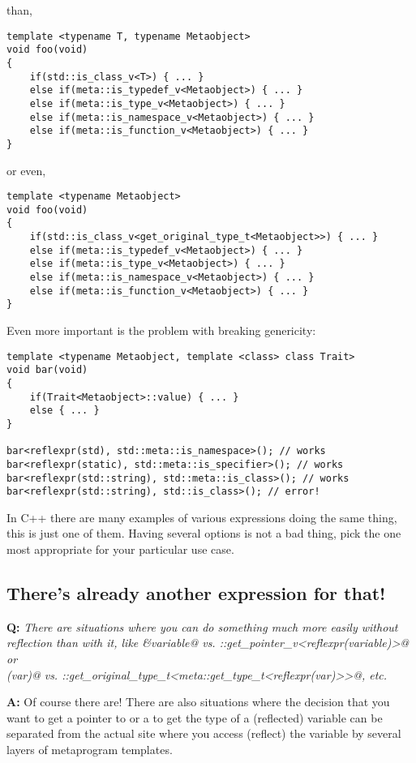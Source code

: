 than,

\begin{verbatim}
template <typename T, typename Metaobject>
void foo(void)
{
	if(std::is_class_v<T>) { ... }
	else if(meta::is_typedef_v<Metaobject>) { ... }
	else if(meta::is_type_v<Metaobject>) { ... }
	else if(meta::is_namespace_v<Metaobject>) { ... }
	else if(meta::is_function_v<Metaobject>) { ... }
}
\end{verbatim}

or even,

\begin{verbatim}
template <typename Metaobject>
void foo(void)
{
	if(std::is_class_v<get_original_type_t<Metaobject>>) { ... }
	else if(meta::is_typedef_v<Metaobject>) { ... }
	else if(meta::is_type_v<Metaobject>) { ... }
	else if(meta::is_namespace_v<Metaobject>) { ... }
	else if(meta::is_function_v<Metaobject>) { ... }
}
\end{verbatim}

Even more important is the problem with breaking genericity:

\begin{verbatim}
template <typename Metaobject, template <class> class Trait>
void bar(void)
{
	if(Trait<Metaobject>::value) { ... }
	else { ... }
}

bar<reflexpr(std), std::meta::is_namespace>(); // works
bar<reflexpr(static), std::meta::is_specifier>(); // works
bar<reflexpr(std::string), std::meta::is_class>(); // works
bar<reflexpr(std::string), std::is_class>(); // error!
\end{verbatim}


In C++ there are many examples of various expressions doing the same thing,
this is just one of them.
Having several options is not a bad thing, pick the one most appropriate for your
particular use case.


\subsection{There's already another expression for that!}

\textbf{Q:} {\em There are situations where you can do something much more
easily without reflection than with it, like \verb@&variable@ vs.
\verb@meta::get_pointer_v<reflexpr(variable)>@ or\\\verb@decltype(var)@ vs.
\verb@meta::get_original_type_t<meta::get_type_t<reflexpr(var)>>@, etc.}

\textbf{A:} Of course there are! There are also situations where the decision
that you want to get a pointer to or a to get the type of a (reflected) variable
can be separated from the actual site where you access (reflect) the variable by
several layers of metaprogram templates.

